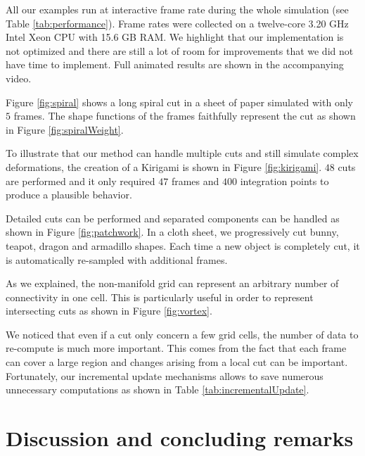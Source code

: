 All our examples run at interactive frame rate during the whole simulation (see Table \ref{tab:performance}). Frame rates were collected on a twelve-core 3.20 GHz Intel Xeon CPU with 15.6 GB RAM. We highlight that our implementation is not optimized and there are still a lot of room for improvements that we did not have time to implement. Full animated results are shown in the accompanying video.

Figure \ref{fig:spiral} shows a long spiral cut in a sheet of paper simulated with only $5$ frames. The shape functions of the frames faithfully represent the cut as shown in Figure \ref{fig:spiralWeight}. 

To illustrate that our method can handle multiple cuts and still simulate complex deformations, the creation of a Kirigami is shown in Figure \ref{fig:kirigami}. $48$ cuts are performed and it only required $47$ frames and $400$ integration points to produce a plausible behavior.

Detailed cuts can be performed and separated components can be handled as shown in Figure \ref{fig:patchwork}. In a cloth sheet, we progressively cut bunny, teapot, dragon and armadillo shapes. Each time a new object is completely cut, it is automatically re-sampled with additional frames.

As we explained, the non-manifold grid can represent an arbitrary number of connectivity in one cell. This is particularly useful in order to represent intersecting cuts as shown in Figure \ref{fig:vortex}.

We noticed that even if a cut only concern a few grid cells, the number of data to re-compute is much more important. This comes from the fact that each frame can cover a large region and changes arising from a local cut can be important. Fortunately, our incremental update mechanisms allows to save numerous unnecessary computations as shown in Table \ref{tab:incrementalUpdate}. 

\section{Discussion and concluding remarks} 
\label{sec:cutting_conclusion}

